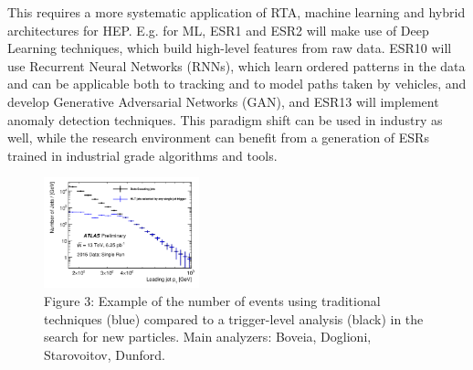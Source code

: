 This requires a more systematic application of RTA, machine learning and 
hybrid architectures for HEP. 
E.g. for ML, ESR1 and ESR2 will make use of Deep Learning techniques,
which build high-level features from raw
data. ESR10 will use Recurrent Neural Networks (RNNs), which learn ordered patterns in the data and can be applicable both to tracking and to model paths taken by vehicles, and develop Generative Adversarial Networks (GAN), and ESR13 will implement anomaly detection techniques. 
This paradigm shift can be used in industry as well, 
while the research environment can benefit from a generation of
ESRs trained in industrial grade algorithms and tools. 

\begin{figure}
	\vspace{-4mm}
\includegraphics[width=0.4\textwidth]{figs/TLA.png} 
    \vspace{-10mm} 
    \caption*{Figure 3: Example of the number of events using traditional techniques (blue) compared to a trigger-level analysis (black)
in the search for new particles. Main analyzers: Boveia, Doglioni, Starovoitov, Dunford. \label{fig:TLA}}
\vspace{-4mm}
    \end{figure}

